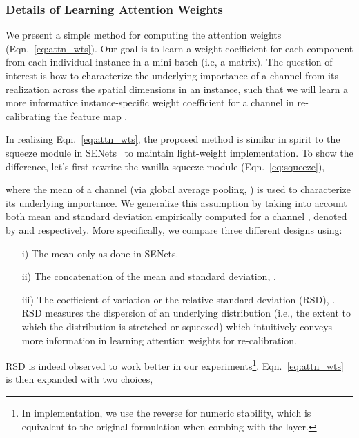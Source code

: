 \documentclass[runningheads]{llncs}
\begin{document}
\subsubsection{Details of Learning Attention Weights}\label{sec:learn_wts} 
We present a simple method for computing the attention weights  (Eqn.~\ref{eq:attn_wts}). Our goal is to learn a weight coefficient for each component from each individual instance in a mini-batch (i.e, a  matrix). 
The question of interest is how to characterize the underlying importance of a channel  from its realization across the spatial dimensions  in an instance, such that we will learn a more informative instance-specific weight coefficient for a channel  in re-calibrating the feature map .

In realizing Eqn.~\ref{eq:attn_wts}, the proposed method is similar in spirit to the squeeze module in SENets~\cite{SENet} to maintain light-weight implementation. To show the difference, let's first rewrite the vanilla squeeze module (Eqn.~\ref{eq:squeeze}), 
 
where the mean of a channel  (via global average pooling, ) is used to characterize its underlying importance. We generalize this assumption by taking into account both mean and standard deviation empirically computed for a channel , denoted by  and  respectively. More specifically, we compare three different designs using: 
\begin{enumerate}
    \item [i)] The mean  only as done in SENets.  
    \item [ii)] The concatenation of the mean and standard deviation, . 
    \item [iii)] The coefficient of variation or the relative standard deviation (RSD), . RSD measures the dispersion of an underlying distribution (i.e., the extent to which the distribution is stretched or squeezed) which intuitively conveys more information in learning attention weights for re-calibration.
\end{enumerate}
 RSD is indeed observed to work better in our experiments\footnote{In implementation, we use the reverse  for numeric stability, which is equivalent to the original formulation when combing with the  layer.}. Eqn.~\ref{eq:attn_wts} is then expanded  with two choices,   
\end{document}
